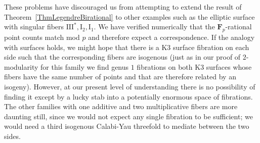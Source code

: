 \documentclass{article}
\def\F{\mathbf{F}}
\newcommand{\III}{\mathrm{III}}
\newcommand{\I}{\mathrm{I}}
\begin{document}
\begin{rmk}
  These problems have discouraged us from attempting to extend the result of
  Theorem~\ref{ThmLegendreBirational} to other examples such as the elliptic
  surface with singular fibers $\III^*, \I_2, \I_1$.  We have verified numerically
  that the $\F_p$-rational point counts match mod $p$ and therefore expect
  a correspondence.  If the analogy with surfaces holds, we might hope that
  there is a K3 surface fibration on each side such that the corresponding
  fibers are isogenous (just as in our proof of $2$-modularity for this
  family we find genus $1$ fibrations on both K3 surfaces whose fibers have
  the same number of points and that are therefore related by an isogeny).
  However, at our present level of understanding there is no possibility of
  finding it except by a lucky stab into a potentially enormous space of
  fibrations.  The other families with one additive and two multiplicative
  fibers are more daunting still, since we would not expect any single
  fibration to be sufficient; we would need a third isogenous Calabi-Yau
  threefold to mediate between the two sides.
\end{rmk}




\end{document}
